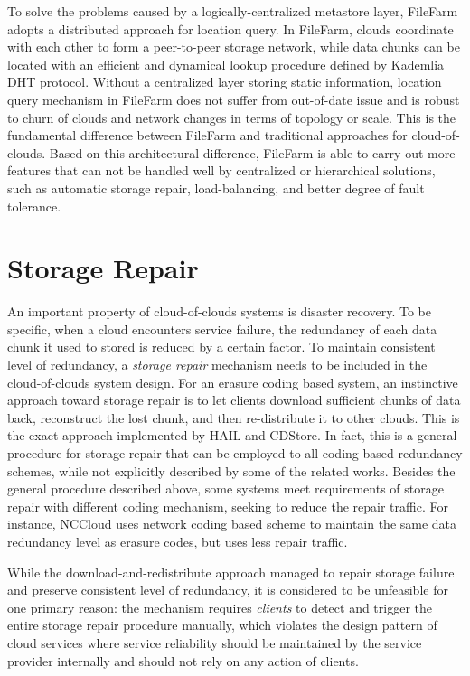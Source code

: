 To solve the problems caused by a logically-centralized metastore layer, FileFarm adopts a distributed approach for location query. In FileFarm, clouds coordinate with each other to form a peer-to-peer storage network, while data chunks can be located with an efficient and dynamical lookup procedure defined by Kademlia\cite{maymounkov2002kademlia} DHT protocol. Without a centralized layer storing static information, location query mechanism in FileFarm does not suffer from out-of-date issue and is robust to churn of clouds and network changes in terms of topology or scale. This is the fundamental difference between FileFarm and traditional approaches for cloud-of-clouds. Based on this architectural difference, FileFarm is able to carry out more features that can not be handled well by centralized or hierarchical solutions, such as automatic storage repair, load-balancing, and better degree of fault tolerance.

\section{Storage Repair}
\label{ss:cocstoragerepair}

An important property of cloud-of-clouds systems is disaster recovery. To be specific, when a cloud encounters service failure, the redundancy of each data chunk it used to stored is reduced by a certain factor. To maintain consistent level of redundancy, a \textit{storage repair} mechanism needs to be included in the cloud-of-clouds system design. For an erasure coding based system, an instinctive approach toward storage repair is to let clients download sufficient chunks of data back, reconstruct the lost chunk, and then re-distribute it to other clouds. This is the exact approach implemented by HAIL\cite{bowers2009hail} and CDStore\cite{li2015cdstore}. In fact, this is a general procedure for storage repair that can be employed to all coding-based redundancy schemes, while not explicitly described by some of the related works. Besides the general procedure described above, some systems meet requirements of storage repair with different coding mechanism, seeking to reduce the repair traffic. For instance, NCCloud\cite{hu2012nccloud} uses network coding based scheme to maintain the same data redundancy level as erasure codes, but uses less repair traffic.

While the download-and-redistribute approach managed to repair storage failure and preserve consistent level of redundancy, it is considered to be unfeasible for one primary reason: the mechanism requires \textit{clients} to detect and trigger the entire storage repair procedure manually, which violates the design pattern of cloud services where service reliability should be maintained by the service provider internally and should not rely on any action of clients.

